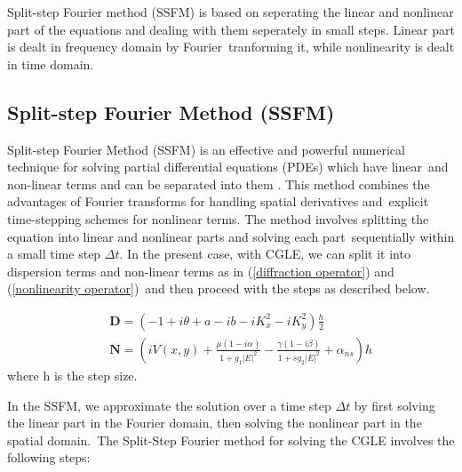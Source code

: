     
Split-step Fourier method (SSFM) is based on seperating the linear and nonlinear part of the equations and dealing with them seperately in small steps. Linear part is dealt in frequency domain by Fourier\
tranforming it, while nonlinearity is dealt in time domain.

\subsection{Split-step Fourier Method (SSFM)}
Split-step Fourier Method (SSFM) is an effective and powerful numerical technique for solving partial differential equations (PDEs) which have linear\
and non-linear terms and can be separated into them \cite{agrawalNonlinearFiberOptics2001,ablowitzInverseScatteringTransformFourier1974}. This method combines the advantages of Fourier transforms for handling spatial derivatives and\
explicit time-stepping schemes for nonlinear terms. The method involves splitting the equation into linear and nonlinear parts and solving each part\ 
sequentially within a small time step $\Delta t$. In the present case, with CGLE, we can split it into dispersion terms and non-linear terms as in (\ref{diffraction operator}) and (\ref{nonlinearity operator})\
and then proceed with the steps as described below.

\begin{eqnarray}
    && \mathbf{D} = \left(-1 + i\theta + a -ib - iK_x^2 -iK_y^2\right) \frac{h}{2} \label{diffraction operator}\\
    && \mathbf{N} = \left(iV(x,y)+ \frac{\mu (1-i\alpha)}{1+g_1|E|^2}- \frac{\gamma (1-i\beta)}{1+s g_2|E|^2} + \alpha_{ns}\right)h \label{nonlinearity operator}
\end{eqnarray}
where h is the step size.

In the SSFM, we approximate the solution over a time step $\Delta t$ by first solving the linear part in the Fourier domain, then solving the nonlinear part in the spatial domain.\
The Split-Step Fourier method for solving the CGLE involves the following steps:

